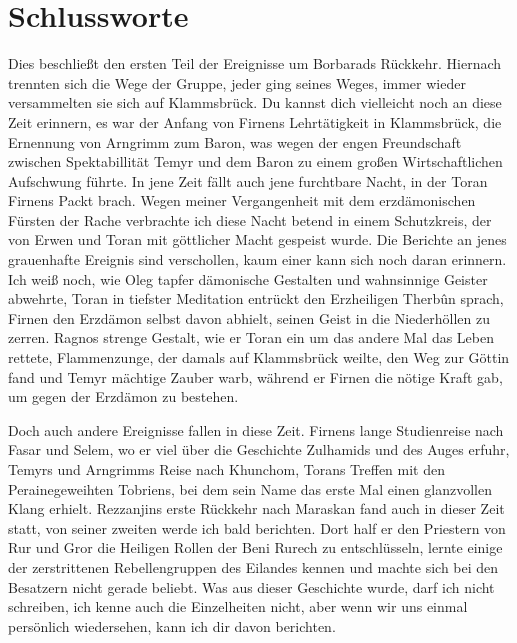 \chapter{Schlussworte}
Dies beschließt den ersten Teil der Ereignisse um Borbarads Rückkehr. Hiernach trennten sich die Wege der Gruppe, jeder ging seines Weges, immer wieder versammelten sie sich auf Klammsbrück. Du kannst dich vielleicht noch an diese Zeit erinnern, es war der Anfang von Firnens Lehrtätigkeit in Klammsbrück, die Ernennung von Arngrimm zum Baron, was wegen der engen Freundschaft zwischen Spektabillität Temyr und dem Baron zu einem großen Wirtschaftlichen Aufschwung führte. In jene Zeit fällt auch jene furchtbare Nacht, in der Toran Firnens Packt brach. Wegen meiner Vergangenheit mit dem erzdämonischen Fürsten der Rache verbrachte ich diese Nacht betend in einem Schutzkreis, der von Erwen und Toran mit göttlicher Macht gespeist wurde. Die Berichte an jenes grauenhafte Ereignis sind verschollen, kaum einer kann sich noch daran erinnern. Ich weiß noch, wie Oleg tapfer dämonische Gestalten und wahnsinnige Geister abwehrte, Toran in tiefster Meditation entrückt den Erzheiligen Therbûn sprach, Firnen den Erzdämon selbst davon abhielt, seinen Geist in die Niederhöllen zu zerren. Ragnos strenge Gestalt, wie er Toran ein um das andere Mal das Leben rettete, Flammenzunge, der damals auf Klammsbrück weilte, den Weg zur Göttin fand und Temyr mächtige Zauber warb, während er Firnen die nötige Kraft gab, um gegen der Erzdämon zu bestehen.\par
Doch auch andere Ereignisse fallen in diese Zeit. Firnens lange Studienreise nach Fasar und Selem, wo er viel über die Geschichte Zulhamids und des Auges erfuhr, Temyrs und Arngrimms Reise nach Khunchom, Torans Treffen mit den Perainegeweihten Tobriens, bei dem sein Name das erste Mal einen glanzvollen Klang erhielt. Rezzanjins erste Rückkehr nach Maraskan fand auch in dieser Zeit statt, von seiner zweiten werde ich bald berichten. Dort half er den Priestern von Rur und Gror die Heiligen Rollen der Beni Rurech zu entschlüsseln, lernte einige der zerstrittenen Rebellengruppen des Eilandes kennen und machte sich bei den Besatzern nicht gerade beliebt. Was aus dieser Geschichte wurde, darf ich nicht schreiben, ich kenne auch die Einzelheiten nicht, aber wenn wir uns einmal persönlich wiedersehen, kann ich dir davon berichten.
